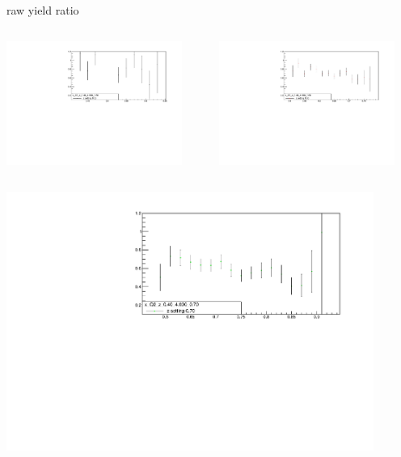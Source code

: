 \begin{frame}{raw yield ratio}
\begin{columns}
\begin{column}[T]{0.5\textwidth}
\includegraphics[width = 0.9\textwidth]{results/yield/statistics/x_Q2_z_0.40_4.000_0.50_ratio.pdf}
\end{column}
\begin{column}[T]{0.5\textwidth}
\includegraphics[width = 0.9\textwidth]{results/yield/statistics/x_Q2_z_0.40_4.000_0.60_ratio.pdf}
\end{column}
\end{columns}
\begin{columns}
\begin{column}[T]{0.5\textwidth}
\includegraphics[width = 0.9\textwidth]{results/yield/statistics/x_Q2_z_0.40_4.000_0.70_ratio.pdf}

\end{column}
\end{columns}
\end{frame}
